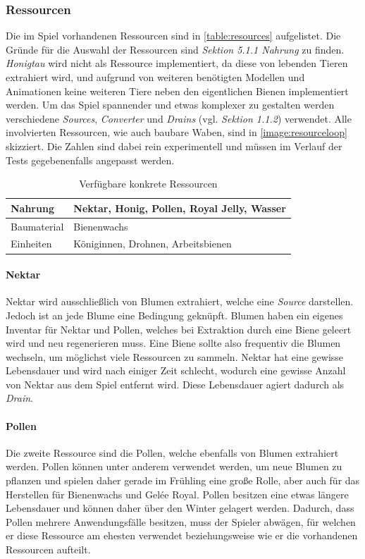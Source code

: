 \subsubsection{Ressourcen}
Die im Spiel vorhandenen Ressourcen sind in \autoref{table:resources} aufgelistet. Die Gründe für die Auswahl der Ressourcen sind \textit{Sektion 5.1.1 Nahrung} zu finden. \textit{Honigtau} wird nicht als Ressource implementiert, da diese von lebenden Tieren extrahiert wird, und aufgrund von weiteren benötigten Modellen und Animationen keine weiteren Tiere neben den eigentlichen Bienen implementiert werden. Um das Spiel spannender und etwas komplexer zu gestalten werden verschiedene \textit{Sources}, \textit{Converter} und \textit{Drains} (vgl. \textit{Sektion 1.1.2}) verwendet. Alle involvierten Ressourcen, wie auch baubare Waben, sind in \autoref{image:resourceloop} skizziert. Die Zahlen sind dabei rein experimentell und müssen im Verlauf der Tests gegebenenfalls angepasst werden.

\begin{table}[]
    \centering
    \caption{Verfügbare konkrete Ressourcen}
    \label{table:resources}
    \begin{tabular}{|l|l|}
    \hline
    Nahrung     & Nektar, Honig, Pollen, Royal Jelly, Wasser \\ \hline
    Baumaterial & Bienenwachs                                \\ \hline
    Einheiten   & Königinnen, Drohnen, Arbeitsbienen         \\ \hline
    \end{tabular}
\end{table}

\paragraph{Nektar}
Nektar wird ausschließlich von Blumen extrahiert, welche eine \textit{Source} darstellen. Jedoch ist an jede Blume eine Bedingung geknüpft. Blumen haben ein eigenes Inventar für Nektar und Pollen, welches bei Extraktion durch eine Biene geleert wird und neu regenerieren muss. Eine Biene sollte also frequentiv die Blumen wechseln, um möglichst viele Ressourcen zu sammeln. Nektar hat eine gewisse Lebensdauer und wird nach einiger Zeit schlecht, wodurch eine gewisse Anzahl von Nektar aus dem Spiel entfernt wird. Diese Lebensdauer agiert dadurch als \textit{Drain}.

\paragraph{Pollen}
Die zweite Ressource sind die Pollen, welche ebenfalls von Blumen extrahiert werden. Pollen können unter anderem verwendet werden, um neue Blumen zu pflanzen und spielen daher gerade im Frühling eine große Rolle, aber auch für das Herstellen für Bienenwachs und Gelée Royal. Pollen besitzen eine etwas längere Lebensdauer und können daher über den Winter gelagert werden. Dadurch, dass Pollen mehrere Anwendungsfälle besitzen, muss der Spieler abwägen, für welchen er diese Ressource am ehesten verwendet beziehungsweise wie er die vorhandenen Ressourcen aufteilt.

